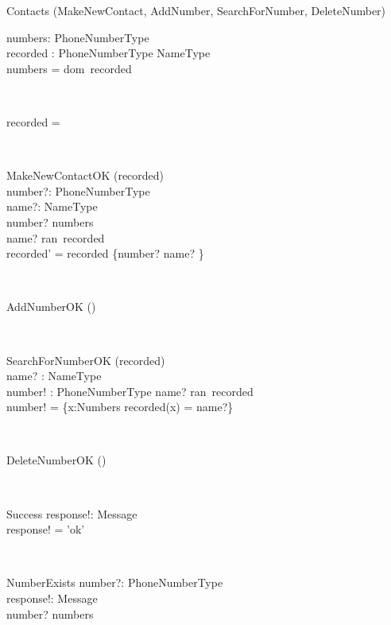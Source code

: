 \begin{class}{Contacts}
\also
\upharpoonright (MakeNewContact, AddNumber, SearchForNumber, DeleteNumber) \\
\begin{state}
numbers:  PhoneNumberType\\
recorded : PhoneNumberType \psur NameType\\
\where
numbers = dom~recorded
\end{state} \\
\begin{init}
recorded = \emptyset %
\end{init} \\
\begin{op}{MakeNewContactOK}
\Delta (recorded) \\
number?: PhoneNumberType \\
name?: NameType \\
\ST
number? \notin numbers \\
name? \notin ran~recorded \\
recorded' = recorded \cup \{number? \mapsto name? \}
\end{op}\\
\begin{op}{AddNumberOK}
\Delta () \\
\ST
\end{op}\\
\begin{op}{SearchForNumberOK}
    \Xi (recorded) \\
    name? : NameType\\
    number! :  PhoneNumberType
    \ST
    name? \in ran~recorded\\
    number! = \{x:Numbers  \mid recorded(x) = name?\}
\end{op}\\
\begin{op}{DeleteNumberOK}
\Delta () \\
\ST
\end{op}\\
\begin{op}{Success}
response!: Message \\
\ST
response! = 'ok'
\end{op}\\
\begin{op}{NumberExists}
number?: PhoneNumberType \\
response!: Message \\
\ST
number? \in numbers \\

\end{op}
\end{class}
